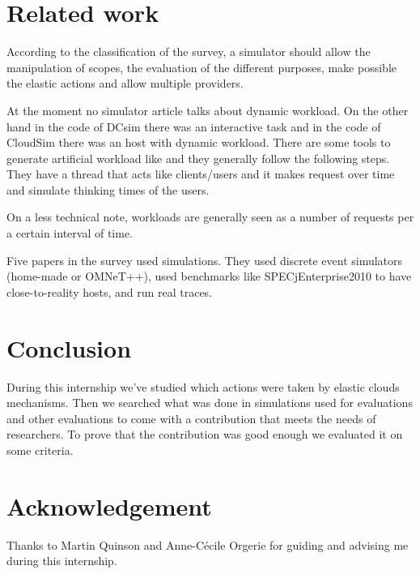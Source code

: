 \documentclass[a4paper, onecolumn]{article}
\begin{document}


\section{Related work} \label{sota}
According to the classification of the survey, a simulator should allow the
manipulation of scopes, the evaluation of the different purposes, make
possible the elastic actions and allow multiple providers.

At the moment no simulator article talks about dynamic workload. On the other
hand in the code of DCsim \cite{tighe2013towards} there was an interactive
task and in the code of CloudSim \cite{calheiros2011cloudsim} there was an
host with dynamic workload. There are some tools to generate artificial
workload like \cite{bodik2010characterizing} and they generally follow the
following steps. They have a thread that acts like clients/users and it makes
request over time and simulate thinking times of the users.

On a less technical note, workloads are generally seen as a number of 
requests per a certain interval of time.

Five papers in the survey used simulations. They used discrete event 
simulators (home-made or OMNeT++), used benchmarks like SPECjEnterprise2010 
to have close-to-reality hosts, and run real traces.
  

\section{Conclusion} \label{conclu}
During this internship we've studied which actions were taken by elastic clouds 
mechanisms. Then we searched what was done in simulations used for evaluations 
and other evaluations to come with a contribution that meets the needs of 
researchers. To prove that the contribution was good enough we evaluated it on 
some criteria.


\section*{Acknowledgement}
Thanks to Martin Quinson and Anne-C\'ecile Orgerie for guiding and advising me 
during this internship.




\end{document}
